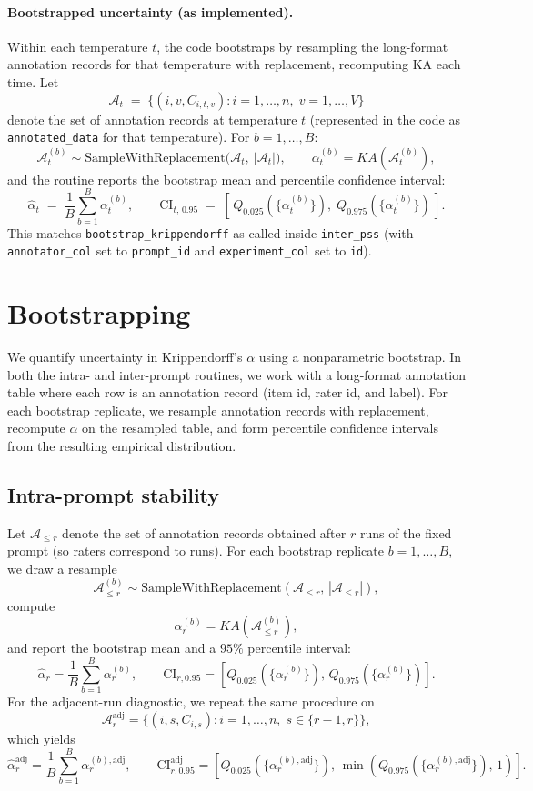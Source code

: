 \paragraph{Bootstrapped uncertainty (as implemented).}
Within each temperature $t$, the code bootstraps by resampling the long-format annotation records for that temperature with replacement, recomputing KA each time. Let
\[
\mathcal{A}_t \;=\; \{(i, v, C_{i,t,v}) : i=1,\ldots,n,\; v=1,\ldots,V\}
\]
denote the set of annotation records at temperature $t$ (represented in the code as \texttt{annotated\_data} for that temperature). For $b=1,\ldots,B$:
\[
\mathcal{A}^{(b)}_{t} \sim \text{SampleWithReplacement}\bigl(\mathcal{A}_t,\ |\mathcal{A}_t|\bigr),
\qquad
\alpha^{(b)}_t = KA\!\left(\mathcal{A}^{(b)}_{t}\right),
\]
and the routine reports the bootstrap mean and percentile confidence interval:
\[
\widehat{\alpha}_t \;=\; \frac{1}{B}\sum_{b=1}^{B}\alpha^{(b)}_t,
\qquad
\text{CI}_{t,\,0.95} \;=\; \left[\, Q_{0.025}(\{\alpha^{(b)}_t\}),\; Q_{0.975}(\{\alpha^{(b)}_t\}) \,\right].
\]
This matches \texttt{bootstrap\_krippendorff} as called inside \texttt{inter\_pss} (with \texttt{annotator\_col} set to \texttt{prompt\_id} and \texttt{experiment\_col} set to \texttt{id}).


\section{Bootstrapping}

We quantify uncertainty in Krippendorff's $\alpha$ using a nonparametric bootstrap. In both the intra- and inter-prompt routines, we work with a long-format annotation table where each row is an annotation record (item id, rater id, and label). For each bootstrap replicate, we resample annotation records with replacement, recompute $\alpha$ on the resampled table, and form percentile confidence intervals from the resulting empirical distribution.

\subsection{Intra-prompt stability}

Let $\mathcal{A}_{\le r}$ denote the set of annotation records obtained after $r$ runs of the fixed prompt (so raters correspond to runs). For each bootstrap replicate $b=1,\ldots,B$, we draw a resample
\[
\mathcal{A}^{(b)}_{\le r} \sim \text{SampleWithReplacement}\!\left(\mathcal{A}_{\le r},\, |\mathcal{A}_{\le r}|\right),
\]
compute
\[
\alpha^{(b)}_{r} = KA\!\left(\mathcal{A}^{(b)}_{\le r}\right),
\]
and report the bootstrap mean and a $95\%$ percentile interval:
\[
\widehat{\alpha}_{r}=\frac{1}{B}\sum_{b=1}^{B}\alpha^{(b)}_{r},
\qquad
\text{CI}_{r,0.95}=\left[Q_{0.025}(\{\alpha^{(b)}_{r}\}),\, Q_{0.975}(\{\alpha^{(b)}_{r}\})\right].
\]
For the adjacent-run diagnostic, we repeat the same procedure on
\[
\mathcal{A}^{\mathrm{adj}}_{r}=\{(i,s,C_{i,s}): i=1,\ldots,n,\; s\in\{r-1,r\}\},
\]
which yields
\[
\widehat{\alpha}^{\mathrm{adj}}_{r}=\frac{1}{B}\sum_{b=1}^{B}\alpha^{(b),\mathrm{adj}}_{r},
\qquad
\text{CI}^{\mathrm{adj}}_{r,0.95}=\left[Q_{0.025}(\{\alpha^{(b),\mathrm{adj}}_{r}\}),\, \min\!\left(Q_{0.975}(\{\alpha^{(b),\mathrm{adj}}_{r}\}),\,1\right)\right].
\]

